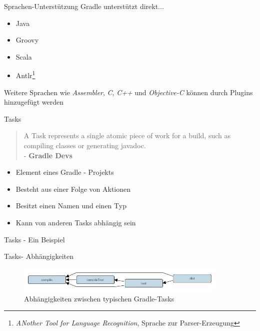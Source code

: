 \documentclass[newPxFont,numfooter,sectionpages]{beamer}
\begin{document}
\begin{frame}{Sprachen-Unterstützung}
Gradle unterstützt direkt...
\begin{itemize}
	\item Java
	\item Groovy
	\item Scala
	\item Antlr\footnote{\emph{ANother Tool for Language Recognition}, Sprache zur Parser-Erzeugung}
\end{itemize}
Weitere Sprachen wie \emph{Assembler}, \emph{C}, \emph{C++} und \emph{Objective-C} können durch Plugins hinzugefügt werden
\end{frame}

\begin{frame}{Tasks}
\vfill
\begin{quotation}
	A Task represents a single atomic piece of work for a build, such as compiling classes or generating javadoc. \\ - \centering \textbf{Gradle Devs}
\end{quotation}
\pause

\begin{itemize}
	\item Element eines Gradle - Projekts
	\item Besteht aus einer Folge von Aktionen
	\item Besitzt einen Namen und einen Typ
	\item Kann von anderen Tasks abhängig sein
\end{itemize}
\end{frame}

\begin{frame}{Tasks - Ein Beispiel}

\end{frame}

\begin{frame}{Tasks- Abhängigkeiten}
\vfill
\begin{figure}
	\centering
	\includegraphics[width=0.9\textwidth]{pics/task_dependencies}
	\caption{Abhängigkeiten zwischen typischen Gradle-Tasks}
	
\end{figure}
\vfill
\end{frame}
\end{document}
